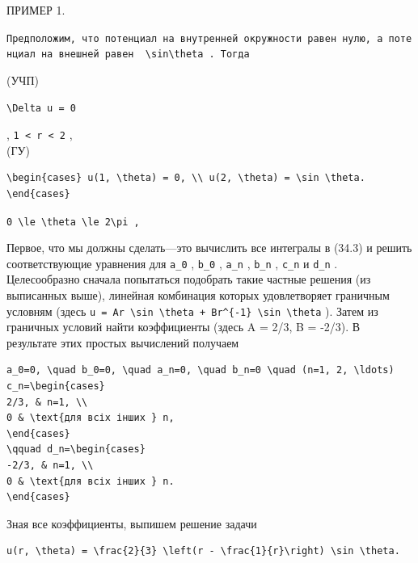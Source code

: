 \documentclass[
  ukrainian,
]{article}
\begin{document}
ПРИМЕР 1.

\texttt{Предположим,\ что\ потенциал\ на\ внутренней\ окружности\ равен\ нулю,\ а\ потенциал\ на\ внешней\ равен\ \ \textquotesingle{}\textbackslash{}sin\textbackslash{}theta\textquotesingle{}\ .\ Тогда}

(УЧП)

\begin{verbatim}
\Delta u = 0
\end{verbatim}

, \texttt{1\ \textless{}\ r\ \textless{}\ 2} ,\\
(ГУ)

\begin{verbatim}
\begin{cases} u(1, \theta) = 0, \\ u(2, \theta) = \sin \theta. \end{cases}
\end{verbatim}

\texttt{\textquotesingle{}0\ \textbackslash{}le\ \textbackslash{}theta\ \textbackslash{}le\ 2\textbackslash{}pi\textquotesingle{}\ ,}

Первое, что мы должны сделать---это вычислить все интегралы в (34.3) и
решить соответствующие уравнения для \texttt{a\_0} , \texttt{b\_0} ,
\texttt{a\_n} , \texttt{b\_n} , \texttt{c\_n} и \texttt{d\_n} .
Целесообразно сначала попытаться подобрать такие частные решения (из
выписанных выше), линейная комбинация которых удовлетворяет граничным
условням (здесь
\texttt{u\ =\ Ar\ \textbackslash{}sin\ \textbackslash{}theta\ +\ Br\^{}\{-1\}\ \textbackslash{}sin\ \textbackslash{}theta}
). Затем из граничных условий найти коэффициенты (здесь A = 2/3, B =
-2/3). В результате этих простых вычислений получаем

\begin{verbatim}
a_0=0, \quad b_0=0, \quad a_n=0, \quad b_n=0 \quad (n=1, 2, \ldots)
c_n=\begin{cases}
2/3, & n=1, \\
0 & \text{для всіх інших } n,
\end{cases}
\qquad d_n=\begin{cases}
-2/3, & n=1, \\
0 & \text{для всіх інших } n.
\end{cases}
\end{verbatim}

Зная все коэффициенты, выпишем решение задачи

\begin{verbatim}
u(r, \theta) = \frac{2}{3} \left(r - \frac{1}{r}\right) \sin \theta.
\end{verbatim}
\end{document}
